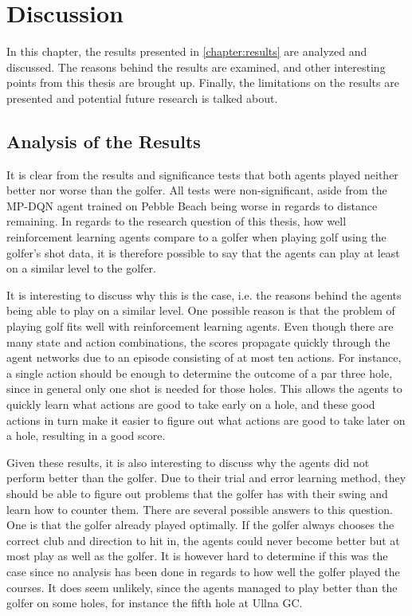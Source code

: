 \documentclass{kththesis}
\begin{document}
\chapter{Discussion}
\label{chapter:discussion}
In this chapter, the results presented in \autoref{chapter:results} are analyzed and discussed. The reasons behind the results are examined, and other interesting points from this thesis are brought up. Finally, the limitations on the results are presented and potential future research is talked about.

\section{Analysis of the Results}
It is clear from the results and significance tests that both agents played neither better nor worse than the golfer. All tests were non-significant, aside from the MP-DQN agent trained on Pebble Beach being worse in regards to distance remaining. In regards to the research question of this thesis, how well reinforcement learning agents compare to a golfer when playing golf using the golfer's shot data, it is therefore possible to say that the agents can play at least on a similar level to the golfer.

It is interesting to discuss why this is the case, i.e. the reasons behind the agents being able to play on a similar level. One possible reason is that the problem of playing golf fits well with reinforcement learning agents. Even though there are many state and action combinations, the scores propagate quickly through the agent networks due to an episode consisting of at most ten actions. For instance, a single action should be enough to determine the outcome of a par three hole, since in general only one shot is needed for those holes. This allows the agents to quickly learn what actions are good to take early on a hole, and these good actions in turn make it easier to figure out what actions are good to take later on a hole, resulting in a good score.

Given these results, it is also interesting to discuss why the agents did not perform better than the golfer. Due to their trial and error learning method, they should be able to figure out problems that the golfer has with their swing and learn how to counter them. There are several possible answers to this question. One is that the golfer already played optimally. If the golfer always chooses the correct club and direction to hit in, the agents could never become better but at most play as well as the golfer. It is however hard to determine if this was the case since no analysis has been done in regards to how well the golfer played the courses. It does seem unlikely, since the agents managed to play better than the golfer on some holes, for instance the fifth hole at Ullna GC. 
\end{document}
